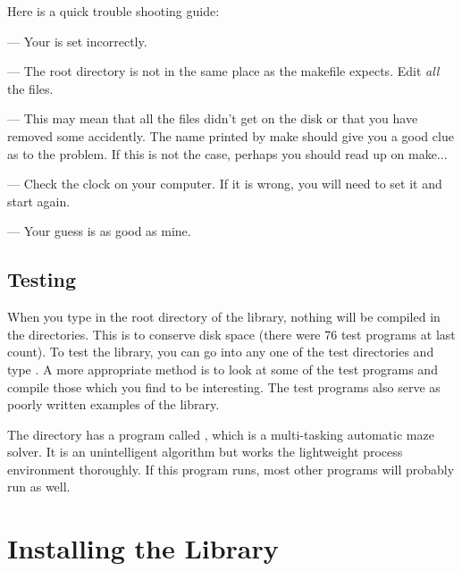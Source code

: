 Here is a quick trouble shooting guide:
\begin{description} 
\item[{\tt Command not found}] ---
    Your  is set incorrectly.

\item[{\tt rules.mak: include file not found}] ---
    The root  directory is not in the same place as the
    makefile expects.  Edit {\em all} the  files.

\item[{\tt Don't know how to make.}] ---
    This may mean that all the files didn't get on the disk or that
    you have removed some accidently.  The name printed by make should
    give you a good clue as to the problem.  If this is not the case,
    perhaps you should read up on make...
    
\item[{\tt xxx: is up to date}] ---
    Check the clock on your computer.  If it is wrong, you will
    need to set it and start again.

\item[Other messages] ---
    Your guess is as good as mine.

\end{description}

\subsection{Testing}

When you type  in the root directory of the library,
nothing will be compiled in the  directories.  This
is to conserve disk space (there were 76 test programs at
last count).  To test the library, you can go into any one of
the test directories and type .  
A more appropriate method is to look at some of the test programs and
compile those which you find to be interesting.  The
test programs also serve as poorly written examples of the library.

The  directory has a program called , which
is a multi-tasking automatic maze solver.  It is an unintelligent algorithm
but works the lightweight process environment thoroughly.  If this program runs,
most other programs will probably run as well.


\section{Installing the Library}
  

